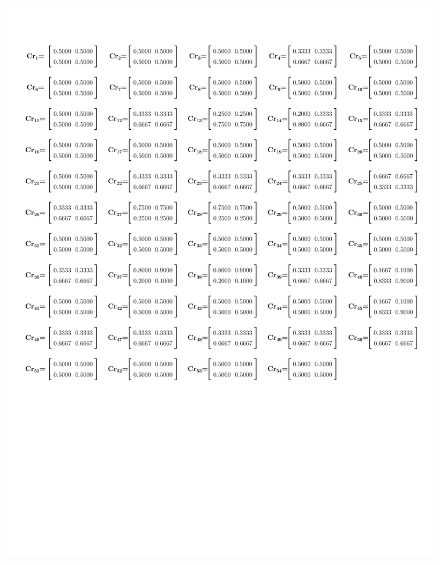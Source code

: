 \newpage
\begin{figure}[H]
	\centering
	\includegraphics[width=15cm]{imagenes/54MatricesNormalizadoMejoradoEx}
	\label{fig:54Matrices}
\end{figure}

